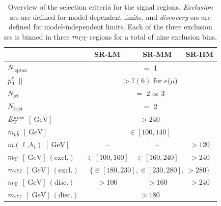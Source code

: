 \begin{table}
	\begin{center}
		\begin{tabular} {l | c c c }
			\toprule
				&  \textbf{SR-LM} & \textbf{SR-MM} & \textbf{SR-HM} \\
			\midrule
			$N_{\mathrm{lepton}}$ & \multicolumn{3}{c}{$=$ 1}\\
			$p^\ell_{\textrm{T}}$ [\GeV] & \multicolumn{3}{c}{ $>7(6)$ for $e$($\mu$)} \\
			$N_\mathrm{jet}$ & \multicolumn{3}{c}{$=$ 2 or 3}\\
			$N_{b\textrm{-jet}}$ &\multicolumn{3}{c}{$=$ 2} \\
			$E_{\textrm{T}}^{\textrm{miss}}$ $[\SI{}{\GeV}]$ & \multicolumn{3}{c}{$>240$}\\
			$m_{b\bar{b}}$  $[\SI{}{\GeV}]$ & \multicolumn{3}{c}{$\in [100,140]$}\\
			$m(\ell,b_1)$ $[\SI{}{\GeV}]$ & -- & -- & $>120$ \\
			\midrule
			$m_{\textrm{T}}$ $[\SI{}{\GeV}]~\mathrm{(excl.)}$&   $\in [100,160]$ & $\in [160,240]$ & $>240$ \\
			
			
			$m_{\textrm{CT}}$ $[\SI{}{\GeV}]~\mathrm{(excl.)}$ &\multicolumn{3}{c}{ $ \{ \in [180,230]$,\,$\in [230,280]$, $>280  \}$}\\
			
			\midrule
			$m_{\textrm{T}}$ $[\SI{}{\GeV}]~\mathrm{(disc.)}$&   $>100$ & $>160$ & $>240$ \\
			$m_{\textrm{CT}}$ $[\SI{}{\GeV}]~\mathrm{(disc.)}$ & \multicolumn{3}{c}{ $>180$}\\
			\bottomrule
		\end{tabular}
		\caption{Overview of the selection criteria for the signal regions. \textit{Exclusion} \glspl{sr} are defined for model-dependent limits, and \textit{discovery} \glspl{sr} are defined for model-independent limits. Each of the three exclusion \glspl{sr} is binned in three $m_{\textrm{CT}}$ regions for a total of nine exclusion bins.} 
		\label{tab:SignalRegionDef}
	\end{center}
\end{table}

